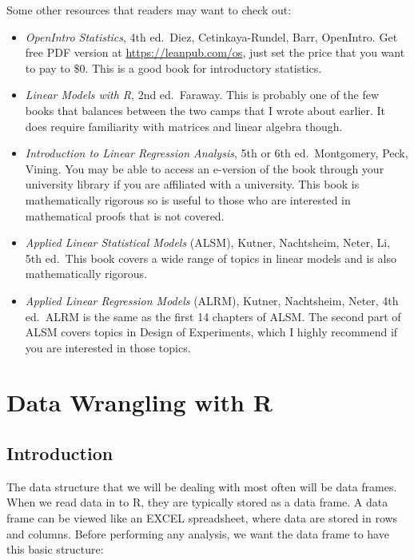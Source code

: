 \documentclass[
]{book}
\begin{document}
Some other resources that readers may want to check out:

\begin{itemize}
\item
  \emph{OpenIntro Statistics}, 4th ed.~Diez, Cetinkaya-Rundel, Barr, OpenIntro. Get free PDF version at \url{https://leanpub.com/os}, just set the price that you want to pay to \$0. This is a good book for introductory statistics.
\item
  \emph{Linear Models with R}, 2nd ed.~Faraway. This is probably one of the few books that balances between the two camps that I wrote about earlier. It does require familiarity with matrices and linear algebra though.
\item
  \emph{Introduction to Linear Regression Analysis}, 5th or 6th ed.~Montgomery, Peck, Vining. You may be able to access an e-version of the book through your university library if you are affiliated with a university. This book is mathematically rigorous so is useful to those who are interested in mathematical proofs that is not covered.
\item
  \emph{Applied Linear Statistical Models} (ALSM), Kutner, Nachtsheim, Neter, Li, 5th ed.~This book covers a wide range of topics in linear models and is also mathematically rigorous.
\item
  \emph{Applied Linear Regression Models} (ALRM), Kutner, Nachtsheim, Neter, 4th ed.~ALRM is the same as the first 14 chapters of ALSM. The second part of ALSM covers topics in Design of Experiments, which I highly recommend if you are interested in those topics.
\end{itemize}

\hypertarget{wrangling}{%
\chapter{Data Wrangling with R}\label{wrangling}}

\hypertarget{introduction}{%
\section{Introduction}\label{introduction}}

The data structure that we will be dealing with most often will be data frames. When we read data in to R, they are typically stored as a data frame. A data frame can be viewed like an EXCEL spreadsheet, where data are stored in rows and columns. Before performing any analysis, we want the data frame to have this basic structure:
\end{document}
